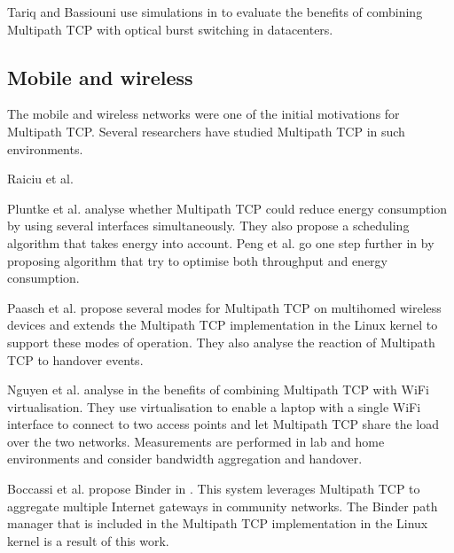 Tariq and Bassiouni use simulations in \cite{Tariz_OBS:2014} to evaluate the benefits of combining Multipath TCP with optical burst switching in datacenters.

\subsection{Mobile and wireless}

The mobile and wireless networks were one of the initial motivations for Multipath TCP. Several researchers have studied Multipath TCP in such environments.

Raiciu et al. \cite{Raiciu_Opportunistic:2011} %

Pluntke et al. \cite{Pluntke_Saving:2011} analyse whether Multipath TCP could reduce energy consumption by using several interfaces simultaneously. They also propose a scheduling algorithm that takes energy into account. Peng et al. go one step further in  %
\cite{Peng_Energy:2014} by proposing algorithm that try to optimise both throughput and energy consumption. %

Paasch et al. \cite{Paasch_Exploring:2012} propose several modes for Multipath TCP on multihomed wireless devices and extends the Multipath TCP implementation in the Linux kernel to support these modes of operation. They also analyse the reaction of Multipath TCP to handover events. 

Nguyen et al. analyse in \cite{Nguyen_cross-layer:2014} the benefits of combining Multipath TCP with WiFi virtualisation. They use virtualisation to enable a laptop with a single WiFi interface to connect to two access points and let Multipath TCP share the load over the two networks. Measurements are performed in lab and home environments and consider bandwidth aggregation and handover. 

Boccassi et al. propose  Binder in \cite{Boccassi_Binder:2013}. This system leverages Multipath TCP to aggregate multiple Internet gateways in community networks. The Binder path manager that is included in the Multipath TCP implementation in the Linux kernel is a result of this work. %

